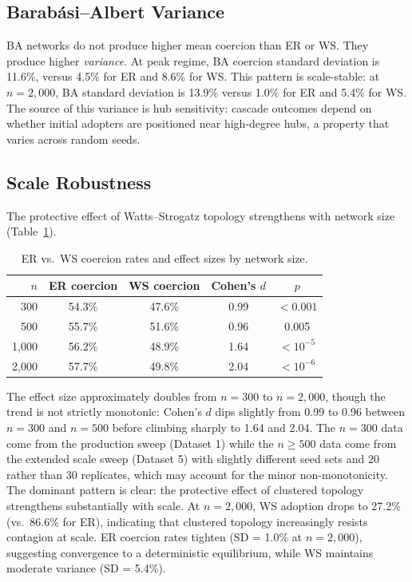 \documentclass[11pt, a4paper]{article}
\begin{document}
\subsection{Barab\'{a}si--Albert Variance}

BA networks do not produce higher mean coercion than ER or WS. They produce higher \textit{variance}. At peak regime, BA coercion standard deviation is 11.6\%, versus 4.5\% for ER and 8.6\% for WS. This pattern is scale-stable: at $n = 2{,}000$, BA standard deviation is 13.9\% versus 1.0\% for ER and 5.4\% for WS. The source of this variance is hub sensitivity: cascade outcomes depend on whether initial adopters are positioned near high-degree hubs, a property that varies across random seeds.

\subsection{Scale Robustness}

The protective effect of Watts--Strogatz topology strengthens with network size (Table~\ref{tab:scale}).

\begin{table}[H]
\centering
\caption{ER vs.\ WS coercion rates and effect sizes by network size.}
\label{tab:scale}
\begin{tabular}{rcccc}
\toprule
$n$ & \textbf{ER coercion} & \textbf{WS coercion} & \textbf{Cohen's} $d$ & $p$ \\
\midrule
300 & 54.3\% & 47.6\% & 0.99 & $< 0.001$ \\
500 & 55.7\% & 51.6\% & 0.96 & 0.005 \\
1{,}000 & 56.2\% & 48.9\% & 1.64 & $< 10^{-5}$ \\
2{,}000 & 57.7\% & 49.8\% & 2.04 & $< 10^{-6}$ \\
\bottomrule
\end{tabular}
\end{table}

The effect size approximately doubles from $n = 300$ to $n = 2{,}000$, though the trend is not strictly monotonic: Cohen's $d$ dips slightly from 0.99 to 0.96 between $n = 300$ and $n = 500$ before climbing sharply to 1.64 and 2.04. The $n = 300$ data come from the production sweep (Dataset 1) while the $n \geq 500$ data come from the extended scale sweep (Dataset 5) with slightly different seed sets and 20 rather than 30 replicates, which may account for the minor non-monotonicity. The dominant pattern is clear: the protective effect of clustered topology strengthens substantially with scale. At $n = 2{,}000$, WS adoption drops to 27.2\% (vs.\ 86.6\% for ER), indicating that clustered topology increasingly resists contagion at scale. ER coercion rates tighten (SD = 1.0\% at $n = 2{,}000$), suggesting convergence to a deterministic equilibrium, while WS maintains moderate variance (SD = 5.4\%).
\end{document}
